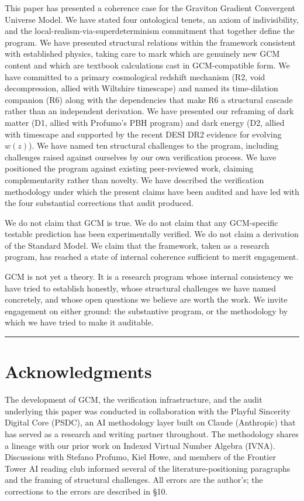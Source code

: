 \documentclass[12pt]{article}
\theoremstyle{definition}
\theoremstyle{remark}
\begin{document}
This paper has presented a coherence case for the Graviton Gradient
Convergent Universe Model. We have stated four ontological tenets, an
axiom of indivisibility, and the local-realism-via-superdeterminism
commitment that together define the program. We have presented
structural relations within the framework consistent with established
physics, taking care to mark which are genuinely new GCM content and
which are textbook calculations cast in GCM-compatible form. We have
committed to a primary cosmological redshift mechanism (R2, void
decompression, allied with Wiltshire timescape) and named its
time-dilation companion (R6) along with the dependencies that make R6 a
structural cascade rather than an independent derivation. We have
presented our reframing of dark matter (D1, allied with Profumo's PBH
program) and dark energy (D2, allied with timescape and supported by the
recent DESI DR2 evidence for evolving \(w(z)\)). We have named ten
structural challenges to the program, including challenges raised
against ourselves by our own verification process. We have positioned
the program against existing peer-reviewed work, claiming
complementarity rather than novelty. We have described the verification
methodology under which the present claims have been audited and have
led with the four substantial corrections that audit produced.

We do not claim that GCM is true. We do not claim that any GCM-specific
testable prediction has been experimentally verified. We do not claim a
derivation of the Standard Model. We claim that the framework, taken as
a research program, has reached a state of internal coherence sufficient
to merit engagement.

GCM is not yet a theory. It is a research program whose internal
consistency we have tried to establish honestly, whose structural
challenges we have named concretely, and whose open questions we believe
are worth the work. We invite engagement on either ground: the
substantive program, or the methodology by which we have tried to make
it auditable.

\begin{center}\rule{0.5\linewidth}{0.5pt}\end{center}

\section*{Acknowledgments}

The development of GCM, the verification infrastructure, and the audit
underlying this paper was conducted in collaboration with the Playful
Sincerity Digital Core (PSDC), an AI methodology layer built on Claude
(Anthropic) that has served as a research and writing partner
throughout. The methodology shares a lineage with our prior work on
Indexed Virtual Number Algebra (IVNA). Discussions with Stefano Profumo,
Kiel Howe, and members of the Frontier Tower AI reading club informed
several of the literature-positioning paragraphs and the framing of
structural challenges. All errors are the author's; the corrections to
the errors are described in §10.
\end{document}
